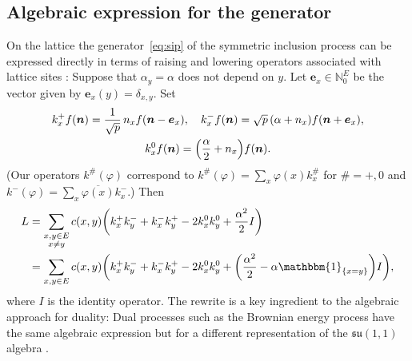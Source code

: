 \documentclass[pdftex]{sigma}
\numberwithin{equation}{section}
\newcommand{\N}{\mathbb{N}}
\newcommand{\vect}[1]{\boldsymbol{#1}}
\newcommand{\one}{\mathbbm{1}}
\newcommand{\1}{\mathbbm{1}}
\begin{document}
\subsection{Algebraic expression for the generator} \label{sec:alg-gen}


On the lattice the generator~\eqref{eq:sip} of the symmetric inclusion process can be expressed directly in terms of raising and lowering operators associated with lattice sites \cite{gkrv}: Suppose that $\alpha_y =\alpha$ does not depend on $y$. Let $\vect e_x \in \N_0^E$ be the vector given by $\vect e_x(y) = \delta_{x,y}$. Set
\begin{gather*}
	k_x^+ f(\vect n ) = \frac{1}{\sqrt p}\, n_x f(\vect n - \vect e_x),\quad
	k_x^- f(\vect n) = \sqrt p\, (\alpha + n_x) f(\vect n + \vect e_x),\\
	k_x^0 f(\vect n) = \Bigl( \frac \alpha 2 + n_x\Bigr) f(\vect n).
\end{gather*}
\big(Our operators $k^\#(\varphi)$ correspond to $k^\#(\varphi) = \!\sum_x \varphi(x) k_x^\#$ for $\#=+,0$ and $k^-(\varphi) =\! \sum_{x} \overline{\varphi(x)} k_x^-$.\big)
Then
\begin{align} \label{eq:sip-algebraic}
	L & = \notag \sum_{\substack{x,y\in E\\x \neq y}} c(x,y)\biggl( k_x^+ k_y^- + k_x^- k_y^+ - 2 k_x^0 k_y^0 + \frac{\alpha^2}{2} I \biggr) \\
 & = \sum_{x,y\in E} c(x,y)\biggl( k_x^+ k_y^- + k_x^- k_y^+ - 2 k_x^0 k_y^0 + \biggl(\frac{\alpha^2}{2} - \alpha \one_{\{x=y\}} \biggr) I \biggr),
\end{align}
where $I$ is the identity operator. The rewrite is a key ingredient to the algebraic approach for duality: Dual processes such as the Brownian energy process have the same algebraic expression but for a different representation of the $\mathfrak{su}(1,1)$ algebra \cite[Section~6.2]{gkrv}.
\end{document}
